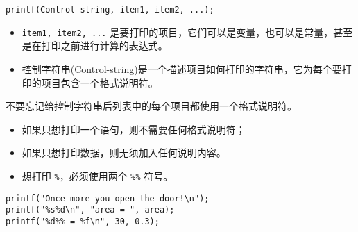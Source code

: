 \begin{frame}[fragile]\ft{\secname}
\begin{free}{}
\lstinline|printf(Control-string, item1, item2, ...);|
\end{free} \vspace{0.1in}

\begin{itemize}
\item \lstinline|item1, item2, ...| 是要打印的项目，它们可以是变量，也可以是常量，甚至是在打印之前进行计算的表达式。\\[0.1in]
\item 控制字符串(Control-string)是一个描述项目如何打印的字符串，它为每个要打印的项目包含一个格式说明符。

\end{itemize} \pause 

\begin{figure}
\centering
{}
\end{figure} \pause 

\begin{free}[注意]{}
不要忘记给控制字符串后列表中的每个项目都使用一个格式说明符。  
\end{free}

\end{frame}

\begin{frame}[fragile]\ft{\secname}
\begin{itemize}
\item 如果只想打印一个语句，则不需要任何格式说明符；\\[0.1in]
\item 如果只想打印数据，则无须加入任何说明内容。\\[0.1in]
\item 想打印 \lstinline|%|，必须使用两个 \lstinline|%%| 符号。
\end{itemize}

\begin{lstlisting}
printf("Once more you open the door!\n");
printf("%s%d\n", "area = ", area);
printf("%d%% = %f\n", 30, 0.3);
\end{lstlisting}
\end{frame}

